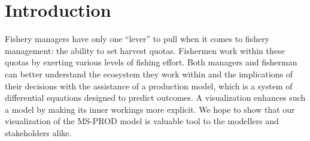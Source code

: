 %
\chapter{Introduction}                %

Fishery managers have only one ``lever'' to pull when it comes to fishery management: the ability to set harvest quotas.  Fishermen work within these quotas by exerting various levels of fishing effort.  Both managers and fisherman can better understand the ecosystem they work within and the implications of their decisions with the assistance of a production model, which is a system of differential equations designed to predict outcomes.  A visualization enhances such a model by making its inner workings more explicit. We hope to show that our visualization of the MS-PROD model is valuable tool to the modellers and stakeholders alike. 
